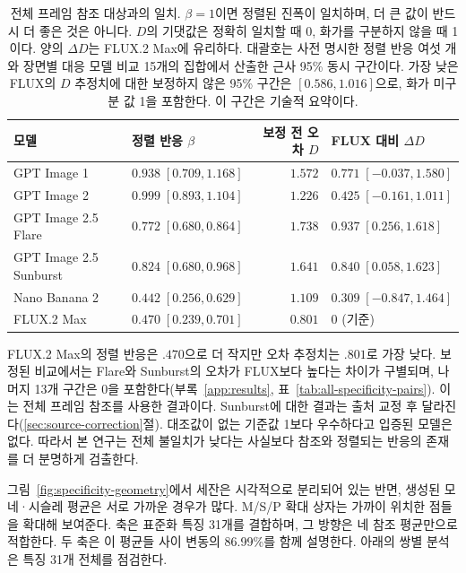 \documentclass[11pt,a4paper]{article}
\begin{document}
\begin{table}[H]
\centering\small\setlength{\tabcolsep}{4pt}
\begin{tabularx}{\linewidth}{@{}>{\raggedright\arraybackslash}p{.24\linewidth}>{\raggedright\arraybackslash}Xr>{\raggedright\arraybackslash}X@{}}
\toprule
모델 & 정렬 반응 $\beta$ & \shortstack{보정 전\\오차 $D$} & FLUX 대비 $\Delta D$\\\midrule
GPT Image 1 & $0.938\;[0.709,1.168]$ & $1.572$ & $0.771\;[-0.037,1.580]$\\[3pt]
GPT Image 2 & $0.999\;[0.893,1.104]$ & $1.226$ & $0.425\;[-0.161,1.011]$\\[3pt]
GPT Image 2.5 Flare & $0.772\;[0.680,0.864]$ & $1.738$ & $0.937\;[0.256,1.618]$\\[3pt]
GPT Image 2.5 Sunburst & $0.824\;[0.680,0.968]$ & $1.641$ & $0.840\;[0.058,1.623]$\\[3pt]
Nano Banana 2 & $0.442\;[0.256,0.629]$ & $1.109$ & $0.309\;[-0.847,1.464]$\\[3pt]
FLUX.2 Max & $0.470\;[0.239,0.701]$ & $0.801$ & $0$ (기준)\\[3pt]
\bottomrule
\end{tabularx}
\caption{전체 프레임 참조 대상과의 일치. $\beta=1$이면 정렬된 진폭이 일치하며, 더 큰 값이 반드시 더 좋은 것은 아니다. $D$의 기댓값은 정확히 일치할 때 0, 화가를 구분하지 않을 때 1이다. 양의 $\Delta D$는 FLUX.2 Max에 유리하다. 대괄호는 사전 명시한 정렬 반응 여섯 개와 장면별 대응 모델 비교 15개의 집합에서 산출한 근사 95\% 동시 구간이다. 가장 낮은 FLUX의 $D$ 추정치에 대한 보정하지 않은 95\% 구간은 $[0.586,1.016]$으로, 화가 미구분 값 1을 포함한다. 이 구간은 기술적 요약이다.}
\label{tab:specificity-models}
\end{table}

FLUX.2 Max의 정렬 반응은 $.470$으로 더 작지만 오차 추정치는 $.801$로 가장 낮다. 보정된 비교에서는 Flare와 Sunburst의 오차가 FLUX보다 높다는 차이가 구별되며, 나머지 13개 구간은 0을 포함한다(부록~\ref{app:results}, 표~\ref{tab:all-specificity-pairs}). 이는 전체 프레임 참조를 사용한 결과이다. Sunburst에 대한 결과는 출처 교정 후 달라진다(\ref{sec:source-correction}절). 대조값이 없는 기준값 1보다 우수하다고 입증된 모델은 없다. 따라서 본 연구는 전체 불일치가 낮다는 사실보다 참조와 정렬되는 반응의 존재를 더 분명하게 검출한다.

그림~\ref{fig:specificity-geometry}에서 세잔은 시각적으로 분리되어 있는 반면, 생성된 모네·시슬레 평균은 서로 가까운 경우가 많다. M/S/P 확대 상자는 가까이 위치한 점들을 확대해 보여준다. 축은 표준화 특징 31개를 결합하며, 그 방향은 네 참조 평균만으로 적합한다. 두 축은 이 평균들 사이 변동의 86.99\%를 함께 설명한다. 아래의 쌍별 분석은 특징 31개 전체를 점검한다.
\end{document}

